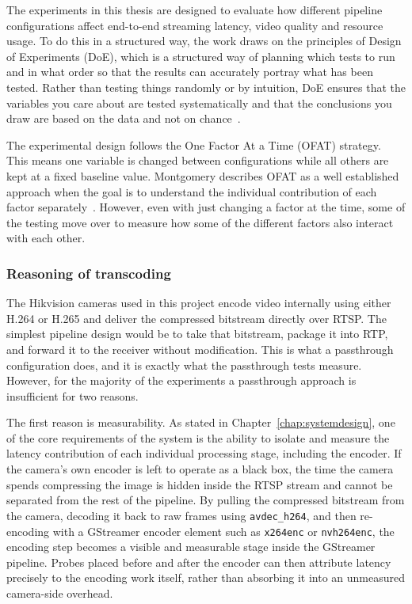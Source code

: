 The experiments in this thesis are designed to evaluate how different pipeline configurations affect end-to-end streaming latency, video quality and resource usage. To do this in a structured way, the work draws on the principles of Design of Experiments (DoE), which is a structured way of planning which tests to run and in what order so that the results can accurately portray what has been tested. Rather than testing things randomly or by intuition, DoE ensures that the variables you care about are tested systematically and that the conclusions you draw are based on the data and not on chance~\cite{montgomery2017}.

The experimental design follows the One Factor At a Time (OFAT) strategy. This means one variable is changed between configurations while all others are kept at a fixed baseline value. Montgomery describes OFAT as a well established approach when the goal is to understand the individual contribution of each factor separately~\cite{montgomery2017}. However, even with just changing a factor at the time, some of the testing move over to measure how some of the different factors also interact with each other.

\subsubsection{Reasoning of transcoding}
The Hikvision cameras used in this project encode video internally using either H.264 or H.265 and deliver the compressed bitstream directly over RTSP. The simplest pipeline design would be to take that bitstream, package it into RTP, and forward it to the receiver without modification. This is what a passthrough configuration does, and it is exactly what the passthrough tests measure. However, for the majority of the experiments a passthrough approach is insufficient for two reasons.

The first reason is measurability. As stated in Chapter~\ref{chap:systemdesign}, one of the core requirements of the system is the ability to isolate and measure the latency contribution of each individual processing stage, including the encoder. If the camera's own encoder is left to operate as a black box, the time the camera spends compressing the image is hidden inside the RTSP stream and cannot be separated from the rest of the pipeline. By pulling the compressed bitstream from the camera, decoding it back to raw frames using \texttt{avdec\_h264}, and then re-encoding with a GStreamer encoder element such as \texttt{x264enc} or \texttt{nvh264enc}, the encoding step becomes a visible and measurable stage inside the GStreamer pipeline. Probes placed before and after the encoder can then attribute latency precisely to the encoding work itself, rather than absorbing it into an unmeasured camera-side overhead.


